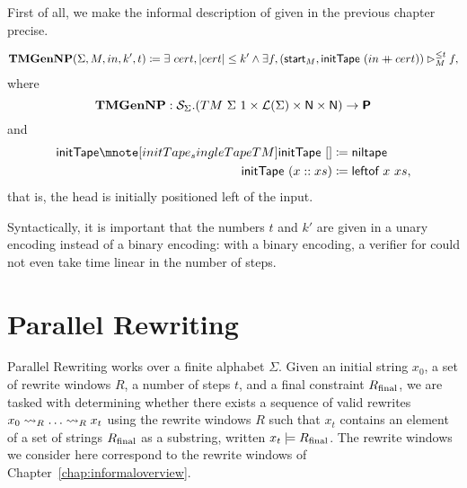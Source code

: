 First of all, we make the informal description of \gennp{} given in the previous chapter precise.
\begin{definition}[TMGenNP][SingleTMGenNP]\label{def:tmgennp}
  \begin{align*}
    \textbf{TMGenNP}{} (\Sigma, M,  in, k', t) \coloneqq \exists~cert, |cert| \le k' \land \exists f, ({\textsf{start}}_M, \textsf{initTape}~(in \mathbin{+\mkern-10mu+} cert)) \rhd_M^{\le t} f, 
  \end{align*}
  where 
  \[\textbf{TMGenNP}{} : \mathcal{S}_{{\Sigma}}. (TM~\Sigma~1 \times \mathcal{L} (\Sigma) \times \mathsf{N} \times \mathsf{N}) \rightarrow \textsf{\bfseries P} \]
  and 
  \begin{align*}
    \mnotec[initTape_singleTapeTM]{\textsf{initTape}}~[] &\defeq \textsf{niltape} \\
    \textsf{initTape}~(x::xs) &\defeq \textsf{leftof}~x~xs,
  \end{align*}
  that is, the head is initially positioned left of the input.
\end{definition}

Syntactically, it is important that the numbers $t$ and $k'$ are given in a unary encoding instead of a binary encoding: with a binary encoding, a verifier for \gennp{} could not even take time linear in the number of steps. 

\section{Parallel Rewriting}\label{sec:pr}
Parallel Rewriting works over a finite alphabet $\Sigma$. Given an initial string $x_0$, a set of rewrite windows $R$, a number of steps $t$, and a final constraint $R_{\text{final}}$, we are tasked with determining whether there exists a sequence of valid rewrites $x_0 \rightsquigarrow_{R} \ldots \rightsquigarrow_{R} x_t$ using the rewrite windows $R$ such that $x_t$ contains an element of a set of strings $R_{\text{final}}$ as a substring, written $x_t \models R_{\text{final}}$. The rewrite windows we consider here correspond to the rewrite windows of Chapter~\ref{chap:informaloverview}.

